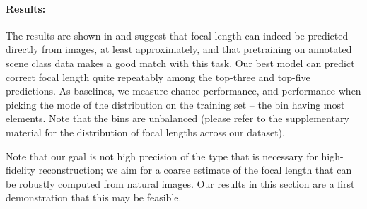 \paragraph{Results:} The results are shown in  and suggest that focal length can indeed be predicted directly from images, at least approximately, and that pretraining on annotated scene class data makes a good match with this task. Our best model can predict correct focal length quite repeatably  among the top-three and top-five predictions. As baselines, we measure chance performance, and performance when picking the mode of the distribution on the training set -- the bin having most elements. Note that the bins are unbalanced (please refer to the supplementary material for the distribution of focal lengths across our dataset).

Note that our goal is not high precision of the type that is necessary for high-fidelity reconstruction; we aim for a coarse estimate of the focal length that can be robustly computed from natural images. Our results in this section are a first demonstration that this may be feasible.

\renewcommand{\arraystretch}{1.4}
\begin{table}
\centering
{}
    \caption{Focal length misclassification rate (top-1, top-3 and top-5 predictions) of networks pretrained on object images from Imagenet and the Places dataset. Lower is better.}
\end{table}
